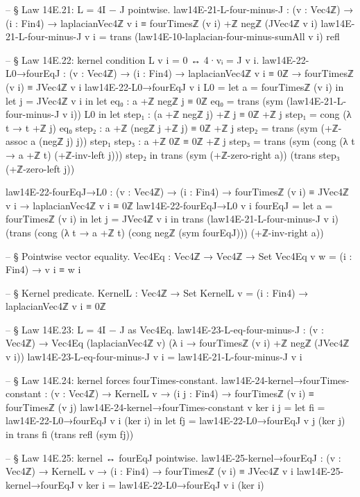 \documentclass[11pt,a4paper]{book}
\begin{document}
\begin{code}
-- § Law 14E.21: L = 4I − J pointwise.
law14E-21-L-four-minus-J : (v : Vec4ℤ) → (i : Fin4) →
  laplacianVec4ℤ v i ≡ fourTimesℤ (v i) +ℤ negℤ (JVec4ℤ v i)
law14E-21-L-four-minus-J v i =
  trans (law14E-10-laplacian-four-minus-sumAll v i) refl

-- § Law 14E.22: kernel condition L v i = 0 ↔ 4·vᵢ = J v i.
law14E-22-L0→fourEqJ : (v : Vec4ℤ) → (i : Fin4) → laplacianVec4ℤ v i ≡ 0ℤ →
  fourTimesℤ (v i) ≡ JVec4ℤ v i
law14E-22-L0→fourEqJ v i L0 =
  let a = fourTimesℤ (v i) in
  let j = JVec4ℤ v i in
  let eq₀ : a +ℤ negℤ j ≡ 0ℤ
      eq₀ = trans (sym (law14E-21-L-four-minus-J v i)) L0
  in
  let step₁ : (a +ℤ negℤ j) +ℤ j ≡ 0ℤ +ℤ j
      step₁ = cong (λ t → t +ℤ j) eq₀
      step₂ : a +ℤ (negℤ j +ℤ j) ≡ 0ℤ +ℤ j
      step₂ = trans (sym (+ℤ-assoc a (negℤ j) j)) step₁
      step₃ : a +ℤ 0ℤ ≡ 0ℤ +ℤ j
      step₃ = trans (sym (cong (λ t → a +ℤ t) (+ℤ-inv-left j))) step₂
  in
  trans
    (sym (+ℤ-zero-right a))
    (trans step₃ (+ℤ-zero-left j))

law14E-22-fourEqJ→L0 : (v : Vec4ℤ) → (i : Fin4) → fourTimesℤ (v i) ≡ JVec4ℤ v i →
  laplacianVec4ℤ v i ≡ 0ℤ
law14E-22-fourEqJ→L0 v i fourEqJ =
  let a = fourTimesℤ (v i) in
  let j = JVec4ℤ v i in
  trans
    (law14E-21-L-four-minus-J v i)
    (trans
      (cong (λ t → a +ℤ t) (cong negℤ (sym fourEqJ)))
      (+ℤ-inv-right a))

-- § Pointwise vector equality.
Vec4Eq : Vec4ℤ → Vec4ℤ → Set
Vec4Eq v w = (i : Fin4) → v i ≡ w i

-- § Kernel predicate.
KernelL : Vec4ℤ → Set
KernelL v = (i : Fin4) → laplacianVec4ℤ v i ≡ 0ℤ

-- § Law 14E.23: L = 4I − J as Vec4Eq.
law14E-23-L-eq-four-minus-J : (v : Vec4ℤ) →
  Vec4Eq (laplacianVec4ℤ v) (λ i → fourTimesℤ (v i) +ℤ negℤ (JVec4ℤ v i))
law14E-23-L-eq-four-minus-J v i = law14E-21-L-four-minus-J v i

-- § Law 14E.24: kernel forces fourTimes-constant.
law14E-24-kernel→fourTimes-constant : (v : Vec4ℤ) → KernelL v → (i j : Fin4) →
  fourTimesℤ (v i) ≡ fourTimesℤ (v j)
law14E-24-kernel→fourTimes-constant v ker i j =
  let fi = law14E-22-L0→fourEqJ v i (ker i) in
  let fj = law14E-22-L0→fourEqJ v j (ker j) in
  trans fi (trans refl (sym fj))

-- § Law 14E.25: kernel ↔ fourEqJ pointwise.
law14E-25-kernel→fourEqJ : (v : Vec4ℤ) → KernelL v → (i : Fin4) →
  fourTimesℤ (v i) ≡ JVec4ℤ v i
law14E-25-kernel→fourEqJ v ker i = law14E-22-L0→fourEqJ v i (ker i)


\end{code}
\end{document}
